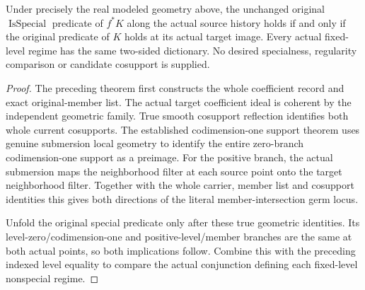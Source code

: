 \begin{theorem}
\label{hir:original-untested-modeled-special-smooth-dictionary}
\leanok
Under precisely the real modeled geometry above, the unchanged original
$\operatorname{IsSpecial}$ predicate of $f^*K$ along the actual source
history holds if and only if the original predicate of $K$ holds at its
actual target image. Every actual fixed-level regime has the same
two-sided dictionary. No desired specialness, regularity comparison or
candidate cosupport is supplied.
\end{theorem}
\begin{proof}
The preceding theorem first constructs the whole coefficient record and
exact original-member list. The actual target coefficient ideal is
coherent by the independent geometric family. True smooth cosupport
reflection identifies both whole current cosupports. The established
codimension-one support theorem uses genuine submersion local geometry
to identify the entire zero-branch codimension-one support as a preimage.
For the positive branch, the actual submersion maps the neighborhood
filter at each source point onto the target neighborhood filter. Together
with the whole carrier, member list and cosupport identities this gives
both directions of the literal member-intersection germ locus.

Unfold the original special predicate only after these true geometric
identities. Its level-zero/codimension-one and positive-level/member
branches are the same at both actual points, so both implications follow.
Combine this with the preceding indexed level equality to compare the
actual conjunction defining each fixed-level nonspecial regime.
\end{proof}

